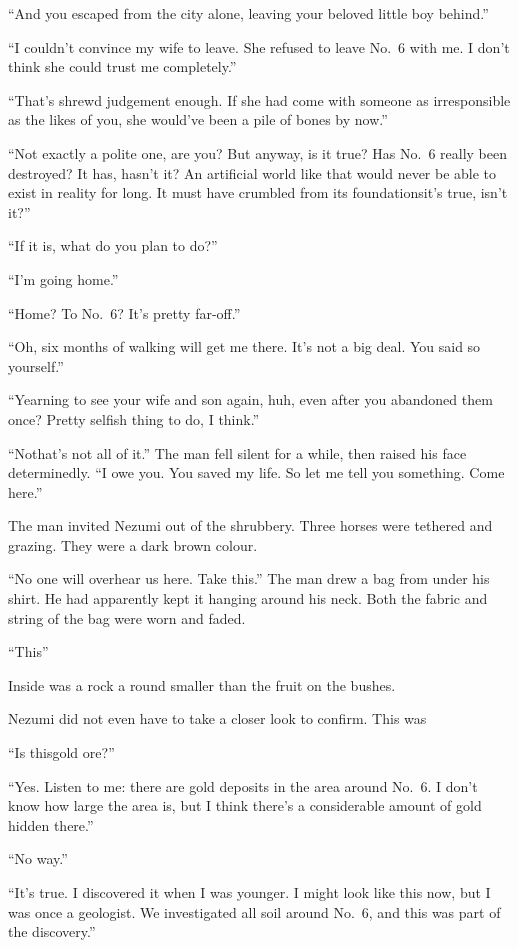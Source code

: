 ``And you escaped from the city alone, leaving your beloved little boy
behind.''

``I couldn't convince my wife to leave. She refused to leave No.~6 with
me. I don't think she could trust me completely.''

``That's shrewd judgement enough. If she had come with someone as
irresponsible as the likes of you, she would've been a pile of bones by
now.''

``Not exactly a polite one, are you? But anyway, is it true? Has No.~6
really been destroyed? It has, hasn't it? An artificial world like that
would never be able to exist in reality for long. It must have crumbled
from its foundations\el it's true, isn't it?''

``If it is, what do you plan to do?''

``I'm going home.''

``Home? To No.~6? It's pretty far-off.''

``Oh, six months of walking will get me there. It's not a big deal. You
said so yourself.''

``Yearning to see your wife and son again, huh, even after you abandoned
them once? Pretty selfish thing to do, I think.''

``No\el that's not all of it.'' The man fell silent for a while, then
raised his face determinedly. ``I owe you. You saved my life. So let me
tell you something. Come here.''

The man invited Nezumi out of the shrubbery. Three horses were tethered
and grazing. They were a dark brown colour.

``No one will overhear us here. Take this.'' The man drew a bag from
under his shirt. He had apparently kept it hanging around his neck. Both
the fabric and string of the bag were worn and faded.

``This\el ''

Inside was a rock a round smaller than the fruit on the bushes.

Nezumi did not even have to take a closer look to confirm. This was\el 

``Is this\el gold ore?''

``Yes. Listen to me: there are gold deposits in the area around No.~6. I
don't know how large the area is, but I think there's a considerable
amount of gold hidden there.''

``No way.''

``It's true. I discovered it when I was younger. I might look like this
now, but I was once a geologist. We investigated all soil around No.~6,
and this was part of the discovery.''

